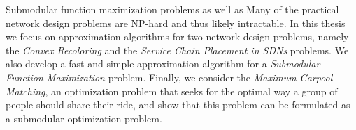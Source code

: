 Submodular function maximization problems as well as Many of the practical network design problems are NP-hard and thus likely intractable. 
In this thesis we focus on approximation algorithms for two network design problems, namely the \emph{Convex Recoloring} and the \emph{Service Chain Placement in SDNs} problems. 
We also develop a fast and simple approximation algorithm for a \emph{Submodular Function Maximization} problem. 
Finally, we consider the \emph{Maximum Carpool Matching}, an optimization problem that seeks for the optimal way a group of people should share their ride, and show that this problem can be formulated as a submodular optimization problem.